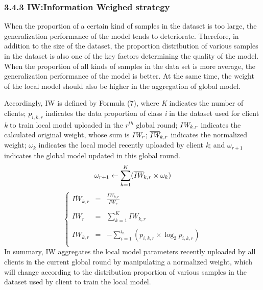 \documentclass[twoside,twocolumn]{article}
\begin{document}
\subsubsection{3.4.3 IW:Information Weighed strategy}When the proportion of a certain kind of samples in the dataset is too large, the generalization performance of the model tends to deteriorate. Therefore, in addition to the size of the dataset, the proportion distribution of various samples in the dataset is also one of the key factors determining the quality of the model. When the proportion of all kinds of samples in the data set is more average, the generalization performance of the model is better. At the same time, the weight of the local model should also be higher in the aggregation of global model.  

	Accordingly, IW is defined by Formula (7), where \emph{K} indicates the number of clients; $p_{i,k,r}$ indicates the data proportion of class \emph{i} in the dataset used for client \emph{k} to train local model uploaded in the $r^{th}$ global round; $\emph{IW}_{k,r}$ indicates the calculated original weight, whose sum is $\emph{IW}_{r}$; $\overline{\emph{IW}}_{k,r}$ indicates the normalized weight; $\omega_k$ indicates the local model recently uploaded by client \emph{k}; and $\omega_{r+1}$ indicates the global model updated in this global round.
\begin{equation}
\omega_{r+1} \leftarrow \sum_{k=1}^{K}(\overline{\emph{IW}}_{k,r} \times \omega_k)
\end{equation}
%
\begin{equation}
\left\{
\begin{array}{lll}
\overline{IW}_{k,r} & = & \frac{IW_{k,r}}{IW_{r}}\\
\\
IW_{r} & = & \sum_{k=1}^{K} IW_{k,r}\\
\\
IW_{k,r} & = & -\sum_{i=1}^{l_{n}}(p_{i,k,r} \times \log_{2}{p_{i,k,r}})\\
\end{array}
\right.
\end{equation}
	In summary, IW aggregates the local model parameters recently uploaded by all clients in the current global round by manipulating a normalized weight, which will change according to the distribution proportion of various samples in the dataset used by client to train the local model.
%
%
\end{document}

